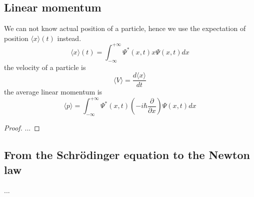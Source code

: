 \subsection{Linear momentum}
We can not know actual position of a particle, hence we use the expectation of position $\langle x\rangle(t)$ instead.
\begin{equation}\boxed{
        \langle x\rangle(t)=\int_{-\infty}^{+\infty}  \Psi^{*}(x, t) x \Psi(x, t) d x}\label{eq4}
\end{equation}
the velocity of a particle is
\begin{equation}\boxed{
        \langle V\rangle = \frac{d\langle x\rangle}{d t}}\label{eq5}
\end{equation}
the average linear momentum is
\begin{equation}\boxed{
        \langle p\rangle=\int_{-\infty}^{+\infty} \Psi^{*}(x, t)\left(-i \hbar \frac{\partial}{\partial x}\right) \Psi(x, t) d x}\label{eq6}
\end{equation}
\begin{proof}
    ...
\end{proof}

\subsection{From the Schrödinger equation to the Newton law}
...